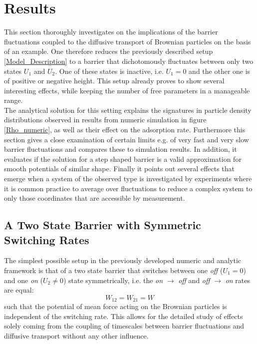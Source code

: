 \chapter{Results}
\label{results}
This section thoroughly investigates on the implications of the barrier fluctuations coupled to the diffusive transport of Brownian particles on the basis of an example. One therefore reduces the previously described setup \ref{Model_Description} to a barrier that dichotomously fluctuates between only two states $U_1$ and $U_2$. One of these states is inactive, i.e. $U_1 = 0$ and the other one is of positive or negative height. This setup already proves to show several interesting effects, while keeping the number of free parameters in a manageable range.\\
The analytical solution for this setting explains the signatures in particle density distributions observed in results from numeric simulation in figure \ref{Rho_numeric}, as well as their effect on the adsorption rate. Furthermore this section gives a close examination of certain limits e.g. of very fast and very slow barrier fluctuations and compares these to simulation results. In addition, it evaluates if the solution for a step shaped barrier is a valid approximation for smooth potentials of similar shape. Finally it points out several effects that emerge when a system of the observed type is investigated by experiments where it is common practice to average over fluctuations to reduce a complex system to only those coordinates that are accessible by measurement.\\
\section*{A Two State Barrier with Symmetric Switching Rates}
The simplest possible setup in the previously developed numeric and analytic framework is that of a two state barrier that switches between one \emph{off} ($U_1 = 0$) and one \emph{on} ($U_2 \ne 0$) state symmetrically, i.e. the \emph{on} $\rightarrow$ \emph{off} and \emph{off} $\rightarrow$ \emph{on} rates are equal: 
\begin{equation}
    W_{1 2}=W_{2 1}=W
    \label{symmetric_rates}
\end{equation}
such that the potential of mean force acting on the Brownian particles is independent of the switching rate.
This allows for the detailed study of effects solely coming from the coupling of timescales between barrier fluctuations and diffusive transport without any other influence.

